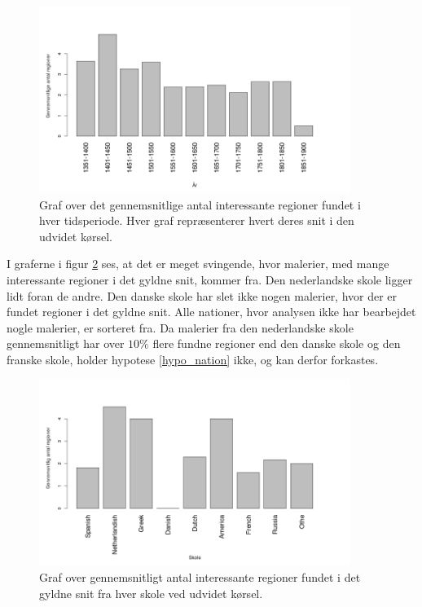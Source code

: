 {\begin{figure}[!h]
	\begin{center}
		\includegraphics[angle=0,width=0.90\textwidth]{afsnit/resultater/billeder/yearcutU.png}
	\end{center}
    \caption{Graf over det gennemsnitlige antal interessante regioner
    fundet i hver tidsperiode. Hver graf repræsenterer hvert deres snit
    i den udvidet kørsel.}
	\label{udvidet_year}
\end{figure}

I graferne i figur \ref{udvidet_nation} ses, at det er meget svingende,
hvor malerier, med mange interessante regioner i det gyldne snit, kommer
fra. Den nederlandske skole ligger lidt foran de andre. Den danske skole har slet ikke
nogen malerier, hvor der er fundet regioner i det gyldne snit. Alle
nationer, hvor analysen ikke har bearbejdet nogle malerier, er sorteret
fra. Da malerier fra den nederlandske skole gennemsnitligt har over
$10\%$ flere fundne regioner end den danske skole og den franske
skole, holder hypotese
\ref{hypo_nation} ikke, og kan derfor forkastes.

\begin{figure}[!h]
	\begin{center}
		\includegraphics[angle=0,width=0.90\textwidth]{afsnit/resultater/billeder/nationcutU.png}
	\end{center}
    \caption{Graf over gennemsnitligt antal interessante regioner fundet
    i det gyldne snit fra hver skole ved udvidet kørsel.}
	\label{udvidet_nation}
\end{figure}

}
